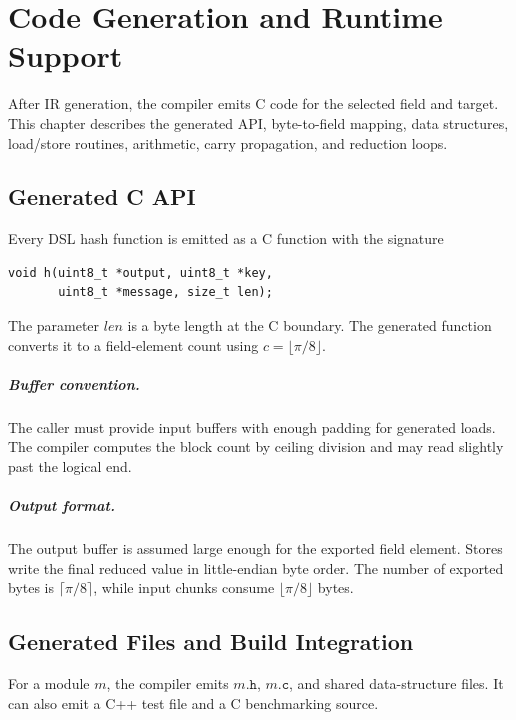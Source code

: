\chapter{Code Generation and Runtime Support}
\label{ch:codegen-runtime}

After IR generation, the compiler emits C code for the selected field and target. This chapter describes the generated API, byte-to-field mapping, data structures, load/store routines, arithmetic, carry propagation, and reduction loops.

\section{Generated C API}
\label{sec:generated-c-api}

Every DSL hash function is emitted as a C function with the signature
\begin{lstlisting}[style=thesisC]
void h(uint8_t *output, uint8_t *key,
       uint8_t *message, size_t len);
\end{lstlisting}
The parameter \(len\) is a byte length at the C boundary. The generated function converts it to a field-element count using \(c=\lfloor \pi/8\rfloor\).

\paragraph{Buffer convention.}
The caller must provide input buffers with enough padding for generated loads. The compiler computes the block count by ceiling division and may read slightly past the logical end.

\paragraph{Output format.}
The output buffer is assumed large enough for the exported field element. Stores write the final reduced value in little-endian byte order. The number of exported bytes is \(\lceil \pi/8\rceil\), while input chunks consume \(\lfloor \pi/8\rfloor\) bytes.

\section{Generated Files and Build Integration}
\label{sec:generated-files}

For a module \(m\), the compiler emits \(m\texttt{.h}\), \(m\texttt{.c}\), and shared data-structure files. It can also emit a C++ test file and a C benchmarking source.

